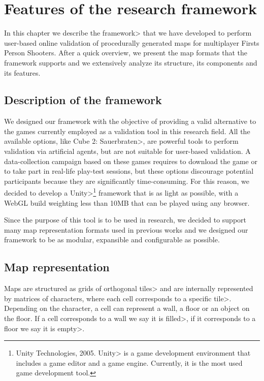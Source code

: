 \chapter{Features of the research framework}


In this chapter we describe the \<framework> that we have developed to perform user-based online validation of procedurally generated maps for multiplayer Firsts Person Shooters. After a quick overview, we present the map formats that the framework supports and we extensively analyze its structure, its components and its features.


\section{Description of the framework}

We designed our framework with the objective of providing a valid alternative to the games currently employed as a validation tool in this research field. All the available options, like \<Cube 2: Sauerbraten>, are powerful tools to perform validation via artificial agents, but are not suitable for user-based validation. A data-collection campaign based on these games requires to download the game or to take part in real-life play-test sessions, but these options discourage potential participants because they are significantly time-consuming. For this reason, we decided to develop a \<Unity>\footnote{Unity Technologies, 2005. \<Unity> is a game development environment that includes a game editor and a game engine. Currently, it is the most used game development tool.} framework that is as light as possible, with a WebGL build weighting less than 10MB that can be played using any browser.

\par

Since the purpose of this tool is to be used in research, we decided to support many map representation formats used in previous works and we designed our framework to be as modular, expansible and configurable as possible.


\section{Map representation}

Maps are structured as grids of orthogonal \<tiles> and are internally represented  by matrices of characters, where each cell corresponds to a specific \<tile>. Depending on the character, a cell can represent a wall, a floor or an object on the floor. If a cell corresponds to a wall we say it is \<filled>, if it corresponds to a floor we say it is \<empty>.

